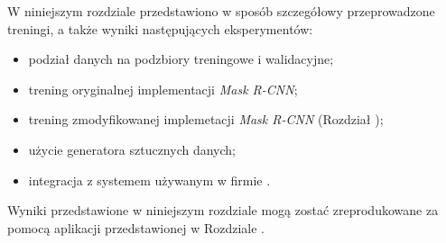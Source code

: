 
W niniejszym rozdziale przedstawiono w sposób szczegółowy przeprowadzone treningi, a także wyniki następujących eksperymentów:

\begin{itemize}
 \item podział danych na podzbiory treningowe i walidacyjne;
 \item trening oryginalnej implementacji \textit{Mask R-CNN};
 \item trening zmodyfikowanej implemetacji \textit{Mask R-CNN} (Rozdział );
 \item użycie generatora sztucznych danych;
 \item integracja z systemem używanym w firmie \blue{}.
\end{itemize}

Wyniki przedstawione w niniejszym rozdziale mogą zostać zreprodukowane za pomocą aplikacji przedstawionej w Rozdziale .
